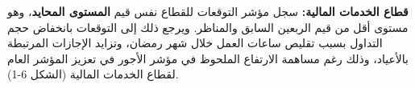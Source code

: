 \textbf{قطاع الخدمات المالية:} سجل مؤشر التوقعات للقطاع نفس قيم \textbf{المستوى المحايد}، وهو مستوى أقل من قيم الربعين السابق والمناظر. ويرجع ذلك إلى التوقعات بانخفاض حجم التداول بسبب تقليص ساعات العمل خلال شهر رمضان، وتزايد الإجازات المرتبطة بالأعياد، وذلك رغم مساهمة الارتفاع الملحوظ في مؤشر الأجور في تعزيز المؤشر العام لقطاع الخدمات المالية (الشكل 6-1).
